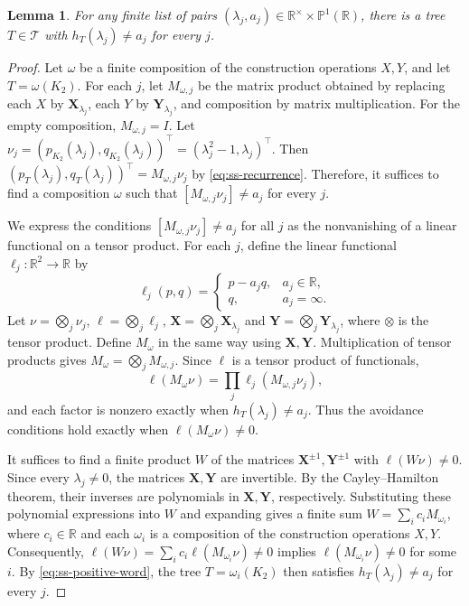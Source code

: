 \documentclass[10pt,a4paper]{article}
\theoremstyle{plain}
\newtheorem{lemma}[theorem]{Lemma}
\theoremstyle{definition}
\newcommand{\R}{\mathbb{R}}
\begin{document}
\begin{lemma}\label{lem:ss-caterpillars}
For any finite list of pairs
$(\lambda_j,a_j)\in\R^\times\times\mathbb P^1(\R)$, there is a tree
$T\in\mathcal T$ with $h_T(\lambda_j)\ne a_j$
for every $j$.
\end{lemma}
\begin{proof}
Let $\omega$ be a finite composition of the construction operations
$X,Y$, and let $T=\omega(K_2)$.
For each $j$, let $M_{\omega,j}$ be the matrix product obtained by
replacing each $X$ by $\mathbf{X}_{\lambda_j}$, each $Y$ by
$\mathbf{Y}_{\lambda_j}$, and composition by matrix multiplication.
For the empty composition, $M_{\omega,j}=I$.
Let $\nu_j=(p_{K_2}(\lambda_j),q_{K_2}(\lambda_j))^{\top}
=(\lambda_j^2-1,\lambda_j)^{\top}$.
Then $(p_T(\lambda_j),q_T(\lambda_j))^{\top}=M_{\omega,j}\nu_j$
by \cref{eq:ss-recurrence}.
Therefore, it suffices to find a composition $\omega$ such that
$[M_{\omega,j}\nu_j]\ne a_j$ for every $j$.

We express the conditions $[M_{\omega,j}\nu_j]\ne a_j$ for all $j$
as the nonvanishing of a linear functional on a tensor product.
For each $j$, define the linear functional
$\ell_j:\R^2\to\R$ by
\begin{equation}\label{eq:ss-avoidance-factors}
 \ell_j(p,q)=
 \begin{cases}
  p-a_jq,&a_j\in\R,\\
  q,&a_j=\infty.
 \end{cases}
\end{equation}
Let
$\nu=\bigotimes_j\nu_j$, $\ell=\bigotimes_j\ell_j$,
$\mathbf{X}=\bigotimes_j\mathbf{X}_{\lambda_j}$ and
$\mathbf{Y}=\bigotimes_j\mathbf{Y}_{\lambda_j}$,
where $\otimes$ is the tensor product.
Define $M_\omega$ in the same way using $\mathbf{X},\mathbf{Y}$.
Multiplication of tensor products gives
$M_\omega=\bigotimes_jM_{\omega,j}$.
Since $\ell$ is a tensor product of functionals,
\begin{equation}\label{eq:ss-positive-word}
 \ell(M_\omega\nu)=\prod_j\ell_j(M_{\omega,j}\nu_j),
\end{equation}
and each factor is nonzero exactly when
$h_T(\lambda_j)\ne a_j$.
Thus the avoidance conditions hold exactly when $\ell(M_\omega\nu)\ne0$.

It suffices to find a finite product $W$ of the matrices
$\mathbf{X}^{\pm1},\mathbf{Y}^{\pm1}$ with $\ell(W\nu)\ne0$.
Since every $\lambda_j\ne0$, the matrices $\mathbf{X},\mathbf{Y}$ are
invertible. By the Cayley--Hamilton theorem, their inverses are
polynomials in $\mathbf{X},\mathbf{Y}$, respectively.
Substituting these polynomial expressions into $W$ and expanding gives
a finite sum $W=\sum_i c_iM_{\omega_i}$, where $c_i\in\R$ and each
$\omega_i$ is a composition of the construction operations $X,Y$.
Consequently, $\ell(W\nu)=\sum_i c_i\ell(M_{\omega_i}\nu)\ne0$
implies $\ell(M_{\omega_i}\nu)\ne0$ for some $i$.
By \cref{eq:ss-positive-word}, the tree $T=\omega_i(K_2)$ then satisfies
$h_T(\lambda_j)\ne a_j$ for every $j$.


\end{proof}
\end{document}
